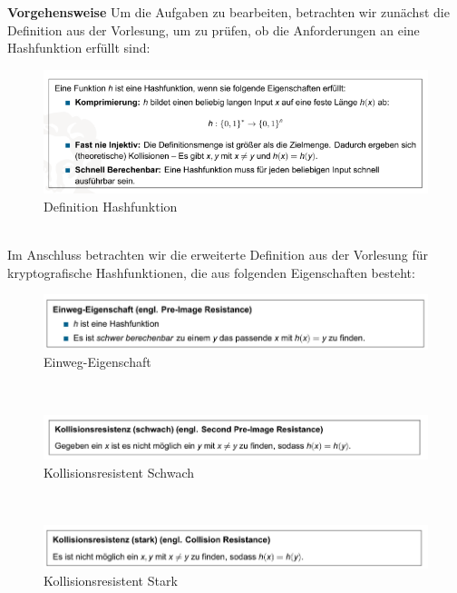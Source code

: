 \documentclass[german]{../uebung}
\begin{document}
\begin{exercise}{1}
    \textbf{Vorgehensweise}
    Um die Aufgaben zu bearbeiten, betrachten wir zunächst die Definition aus der Vorlesung, um zu prüfen, ob die Anforderungen an eine Hashfunktion erfüllt sind:\\
    \begin{figure}[h]
        \centering
        \includegraphics*[scale=.5]{Definition Hashfunktion.png}
        \caption{Definition Hashfunktion}
    \end{figure}\\
    Im Anschluss betrachten wir die erweiterte Definition aus der Vorlesung für kryptografische Hashfunktionen, die aus folgenden Eigenschaften besteht:\\
    \begin{figure}[h]
        \centering
        \includegraphics*[scale=.5]{EinwegEigenschaft.png}
        \caption{Einweg-Eigenschaft}
    \end{figure}\\
    \begin{figure}[h]
        \centering
        \includegraphics*[scale=.5]{Kollisionsresistent.png}
        \caption{Kollisionsresistent Schwach}
    \end{figure}\\
    \begin{figure}[h]
        \centering
        \includegraphics*[scale=.5]{KollisionsresistentStark.png}
        \caption{Kollisionsresistent Stark}

\end{figure}
\end{exercise}
\end{document}
